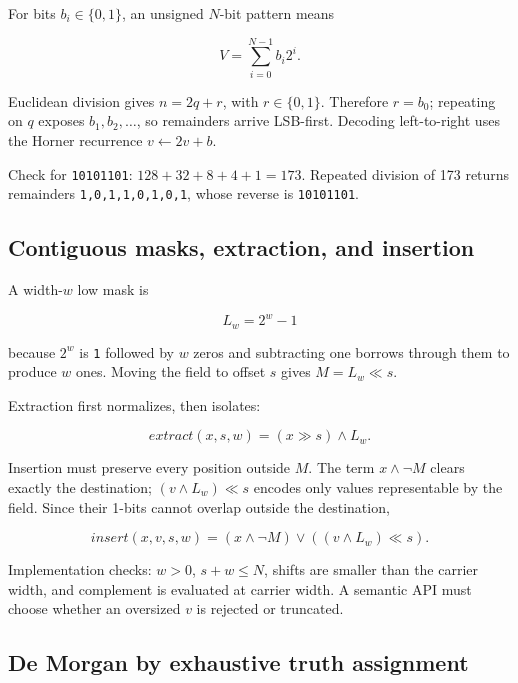 \hypertarget{03-visual-computing-i-ch018-unsigned-positional-value-and-base-conversion}{}

For bits \(b_i\in\{0,1\}\), an unsigned \(N\)-bit pattern means

\[
V=\sum_{i=0}^{N-1}b_i2^i.
\]

Euclidean division gives \(n=2q+r\), with \(r\in\{0,1\}\). Therefore \(r=b_0\); repeating on \(q\) exposes \(b_1,b_2,\ldots\), so remainders arrive LSB-first. Decoding left-to-right uses the Horner recurrence \(v\leftarrow2v+b\).

Check for \texttt{10101101}: \(128+32+8+4+1=173\). Repeated division of 173 returns remainders \texttt{1,0,1,1,0,1,0,1}, whose reverse is \texttt{10101101}.

\subsection{Contiguous masks, extraction, and insertion}\label{03-visual-computing-i-ch018-contiguous-masks-extraction-and-insertion}

\hypertarget{03-visual-computing-i-ch018-contiguous-masks-extraction-and-insertion}{}

A width-\(w\) low mask is

\[
L_w=2^w-1
\]

because \(2^w\) is \texttt{1} followed by \(w\) zeros and subtracting one borrows through them to produce \(w\) ones. Moving the field to offset \(s\) gives \(M=L_w\ll s\).

Extraction first normalizes, then isolates:

\[
extract(x,s,w)=(x\gg s)\land L_w.
\]

Insertion must preserve every position outside \(M\). The term \(x\land\neg M\) clears exactly the destination; \((v\land L_w)\ll s\) encodes only values representable by the field. Since their 1-bits cannot overlap outside the destination,

\[
insert(x,v,s,w)=(x\land\neg M)\lor((v\land L_w)\ll s).
\]

Implementation checks: \(w>0\), \(s+w\le N\), shifts are smaller than the carrier width, and complement is evaluated at carrier width. A semantic API must choose whether an oversized \(v\) is rejected or truncated.

\subsection{De Morgan by exhaustive truth assignment}\label{03-visual-computing-i-ch018-de-morgan-by-exhaustive-truth-assignment}

